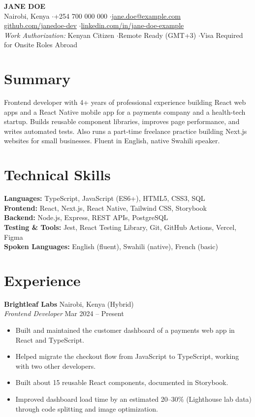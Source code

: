 \documentclass[10pt, letterpaper]{article}
\begin{document}
\pagestyle{empty}

\begin{center}
    {\LARGE \textbf{JANE DOE}} \\ \vspace{2pt}
    Nairobi, Kenya \quad$\cdot$\quad +254 700 000 000 \quad$\cdot$\quad \href{mailto:jane.doe@example.com}{jane.doe@example.com} \\
    \href{https://github.com/janedoe-dev}{github.com/janedoe-dev} \quad$\cdot$\quad \href{https://www.linkedin.com/in/jane-doe-example}{linkedin.com/in/jane-doe-example} \\
    \textit{Work Authorization:} Kenyan Citizen \quad$\cdot$\quad Remote Ready (GMT+3) \quad$\cdot$\quad Visa Required for Onsite Roles Abroad
\end{center}

\section*{Summary}
Frontend developer with 4+ years of professional experience building React web apps and a React Native mobile app for a payments company and a health-tech startup. Builds reusable component libraries, improves page performance, and writes automated tests. Also runs a part-time freelance practice building Next.js websites for small businesses. Fluent in English, native Swahili speaker.

\section*{Technical Skills}
\textbf{Languages:} TypeScript, JavaScript (ES6+), HTML5, CSS3, SQL \\
\textbf{Frontend:} React, Next.js, React Native, Tailwind CSS, Storybook \\
\textbf{Backend:} Node.js, Express, REST APIs, PostgreSQL \\
\textbf{Testing \& Tools:} Jest, React Testing Library, Git, GitHub Actions, Vercel, Figma \\
\textbf{Spoken Languages:} English (fluent), Swahili (native), French (basic)

\section*{Experience}

\textbf{Brightleaf Labs} \hfill Nairobi, Kenya (Hybrid) \\
\textit{Frontend Developer} \hfill Mar 2024 -- Present
\begin{itemize}
    \item Built and maintained the customer dashboard of a payments web app in React and TypeScript.
    \item Helped migrate the checkout flow from JavaScript to TypeScript, working with two other developers.
    \item Built about 15 reusable React components, documented in Storybook.
    \item Improved dashboard load time by an estimated 20--30\% (Lighthouse lab data) through code splitting and image optimization.
\end{itemize}
\end{document}
